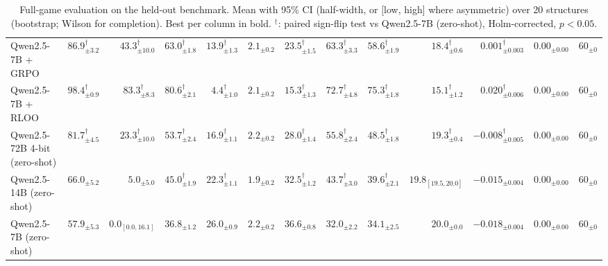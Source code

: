 \begin{table}[t]
\begin{tabular}{lrrrrrrrrrrrr}
\midrule
Qwen2.5-7B + GRPO & $86.9_{\pm 3.2}^{\dagger}$ & $43.3_{\pm 10.0}^{\dagger}$ & $63.0_{\pm 1.8}^{\dagger}$ & $13.9_{\pm 1.3}^{\dagger}$ & $2.1_{\pm 0.2}$ & $23.5_{\pm 1.5}^{\dagger}$ & $63.3_{\pm 3.3}^{\dagger}$ & $58.6_{\pm 1.9}^{\dagger}$ & $18.4_{\pm 0.6}^{\dagger}$ & $0.001_{\pm 0.003}^{\dagger}$ & $\mathbf{0.00}_{\pm 0.00}$ & $60_{\pm 0}$ \\
Qwen2.5-7B + RLOO & $98.4_{\pm 0.9}^{\dagger}$ & $83.3_{\pm 8.3}^{\dagger}$ & $80.6_{\pm 2.1}^{\dagger}$ & $4.4_{\pm 1.0}^{\dagger}$ & $2.1_{\pm 0.2}$ & $15.3_{\pm 1.3}^{\dagger}$ & $72.7_{\pm 4.8}^{\dagger}$ & $75.3_{\pm 1.8}^{\dagger}$ & $15.1_{\pm 1.2}^{\dagger}$ & $0.020_{\pm 0.006}^{\dagger}$ & $\mathbf{0.00}_{\pm 0.00}$ & $60_{\pm 0}$ \\
\midrule
Qwen2.5-72B 4-bit (zero-shot) & $81.7_{\pm 4.5}^{\dagger}$ & $23.3_{\pm 10.0}^{\dagger}$ & $53.7_{\pm 2.4}^{\dagger}$ & $16.9_{\pm 1.1}^{\dagger}$ & $2.2_{\pm 0.2}$ & $28.0_{\pm 1.4}^{\dagger}$ & $55.8_{\pm 2.4}^{\dagger}$ & $48.5_{\pm 1.8}^{\dagger}$ & $19.3_{\pm 0.4}^{\dagger}$ & $-0.008_{\pm 0.005}^{\dagger}$ & $\mathbf{0.00}_{\pm 0.00}$ & $60_{\pm 0}$ \\
Qwen2.5-14B (zero-shot) & $66.0_{\pm 5.2}$ & $5.0_{\pm 5.0}$ & $45.0_{\pm 1.9}^{\dagger}$ & $22.3_{\pm 1.1}^{\dagger}$ & $\mathbf{1.9}_{\pm 0.2}$ & $32.5_{\pm 1.2}^{\dagger}$ & $43.7_{\pm 3.0}^{\dagger}$ & $39.6_{\pm 2.1}^{\dagger}$ & $19.8_{[19.5, 20.0]}$ & $-0.015_{\pm 0.004}$ & $\mathbf{0.00}_{\pm 0.00}$ & $60_{\pm 0}$ \\
Qwen2.5-7B (zero-shot) & $57.9_{\pm 5.3}$ & $0.0_{[0.0, 16.1]}$ & $36.8_{\pm 1.2}$ & $26.0_{\pm 0.9}$ & $2.2_{\pm 0.2}$ & $36.6_{\pm 0.8}$ & $32.0_{\pm 2.2}$ & $34.1_{\pm 2.5}$ & $20.0_{\pm 0.0}$ & $-0.018_{\pm 0.004}$ & $\mathbf{0.00}_{\pm 0.00}$ & $60_{\pm 0}$ \\
\bottomrule
\end{tabular}
\caption{Full-game evaluation on the held-out benchmark. Mean with 95\% CI (half-width, or [low, high] where asymmetric) over 20 structures (bootstrap; Wilson for completion). Best per column in bold. $^\dagger$: paired sign-flip test vs Qwen2.5-7B (zero-shot), Holm-corrected, $p<0.05$.}
\label{tab:main_results}
\end{table}
